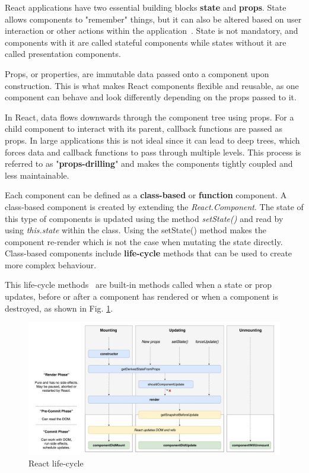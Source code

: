 React applications have two essential building blocks \textbf{state} and \textbf{props}. State allows components to "remember" things, but it can also be altered based on user interaction or other actions within the application~\cite{react-state-and-lifecycle}. State is not mandatory, and components with it are called stateful components while states without it are called presentation components.

Props, or properties, are immutable data passed onto a component upon construction. This is what makes React components flexible and reusable, as one component can behave and look differently depending on the props passed to it.

In React, data flows downwards through the component tree using props. For a child component to interact with its parent, callback functions are passed as props. In large applications this is not ideal since it can lead to deep trees, which forces data and callback functions to pass through multiple levels. This process is referred to as "\textbf{props-drilling}" and makes the components tightly coupled and less maintainable.

Each component can be defined as a \textbf{class-based} or \textbf{function} component. A class-based component is created by extending the \textit{React.Component}. The state of this type of components is updated using the method \textit{setState()} and read by using \textit{this.state} within the class. Using the setState() method makes the component re-render which is not the case when mutating the state directly. Class-based components include \textbf{life-cycle} methods that can be used to create more complex behaviour.

This life-cycle methods~\cite{react-state-and-lifecycle} are built-in methods called when a state or prop updates, before or after a component has rendered or when a component is destroyed, as shown in Fig. \ref{fig:react-lifecycle}.

\begin{figure}[H]
	\centering
	\includegraphics[width=1\linewidth]{Chapters/img/2_background/react-lifecycle.jpeg}
	\caption{React life-cycle \cite{react-lifecycle}}
	\label{fig:react-lifecycle}
\end{figure}

